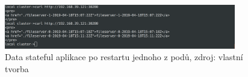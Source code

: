 \begin{figure}[H]
  \begin{centering}
	  \includegraphics[width=0.9\textwidth]{images/curl2.png}
    \par
	  \caption{Data stateful aplikace po restartu jednoho z podů\label{fig:curl2}, zdroj: vlastní tvorba}
    \end{centering}
\end{figure}
